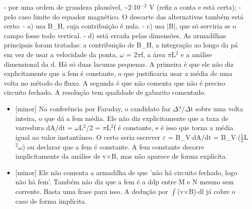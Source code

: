 \documentclass{article}%
\begin{document}
{-} por uma ordem de grandeza plausível, \textasciitilde{}2$\cdot$10$^{-}$$^2$ V (refiz a conta e está certa);\newline%
{-} pelo caso limite do equador magnético.\newline%
\newline%
O descarte das alternativas também está certo:\newline%
{-} a) usa B\_H, cuja contribuição é nula.\newline%
{-} c) usa |B|, que só serviria se o campo fosse todo vertical.\newline%
{-} d) está errada pelas dimensões.\newline%
\newline%
As armadilhas principais foram tratadas: a contribuição de B\_H, a integração ao longo da pá em vez de usar a velocidade da ponta, $\omega$ = 2$\pi$f, a área $\pi$L$^2$ e a análise dimensional da d.\newline%
\newline%
Há só duas lacunas pequenas. A primeira é que ele não diz explicitamente que a fem é constante, o que justificaria usar a média de uma volta no método do fluxo. A segunda é que não comenta que não é preciso circuito fechado. A resolução tem qualidade de gabarito comentado.%
\begin{itemize}%
\item%
{[}minor{]} Na conferência por Faraday, o candidato faz $\Delta$?/$\Delta$t sobre uma volta inteira, o que dá a fem média. Ele não diz explicitamente que a taxa de varredura dA/dt = $\omega$L$^2$/2 = $\pi$L$^2$f é constante, e é isso que torna a média igual ao valor instantâneo. O certo seria escrever $\varepsilon$ = B\_V$\cdot$dA/dt = B\_V$\cdot$($\frac12$L$^2$$\omega$) ou declarar que a fem é constante. A fem constante decorre implicitamente da análise de v$\times$B, mas não aparece de forma explícita.%
\item%
{[}minor{]} Ele não comenta a armadilha de que 'não há circuito fechado, logo não há fem'. Também não diz que a fem é a ddp entre M e N mesmo sem corrente. Basta uma frase para isso. A dedução por $\int$(v$\times$B)$\cdot$dl já cobre o caso de forma implícita.%
\end{itemize}%
\end{document}
